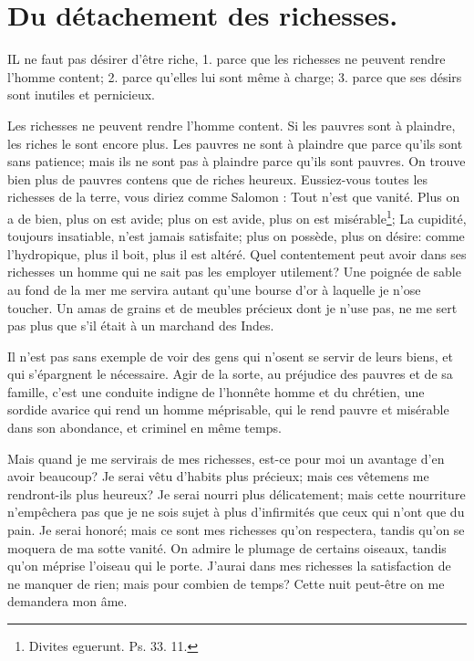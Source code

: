 \documentclass[instructions.tex]{subfiles}
\begin{document}
 
\chapter{Du détachement des richesses.}
 
IL ne faut pas désirer d’être riche, 1. parce que les richesses ne peuvent rendre l’homme content; 2. parce qu’elles lui sont même à charge; 3. parce que ses désirs sont inutiles et pernicieux.
 
\primo Les richesses ne peuvent rendre l’homme content. Si les pauvres sont à plaindre, les riches le sont encore plus. Les pauvres ne sont à plaindre que parce qu’ils sont sans patience; mais ils ne sont pas à plaindre parce qu’ils sont pauvres. On trouve bien plus de pauvres contens que de riches heureux. Eussiez-vous toutes les richesses de la terre, vous diriez comme Salomon : Tout n’est que vanité. Plus on a de bien, plus on est avide; plus on est avide, plus on est misérable\footnote{Divites eguerunt. Ps. 33. 11.}; La cupidité, toujours insatiable, n’est jamais satisfaite; plus on possède, plus on désire: comme l’hydropique, plus il boit, plus il est altéré. Quel contentement peut avoir dans ses richesses un homme qui ne sait pas les employer utilement? Une poignée de sable au fond de la mer me servira autant qu’une bourse d’or à laquelle je n’ose toucher. Un amas de grains et de meubles précieux dont je n’use pas, ne me sert pas plus que s’il était à un marchand des Indes.
 
Il n’est pas sans exemple de voir des gens qui n’osent se servir de leurs biens, et qui s’épargnent le nécessaire. Agir de la sorte, au préjudice des pauvres et de sa famille, c’est une conduite indigne de l’honnête homme et du chrétien, une sordide avarice qui rend un homme méprisable, qui le rend pauvre et misérable dans son abondance, et criminel en même temps.
 
Mais quand je me servirais de mes richesses, est-ce pour moi un avantage d’en avoir beaucoup? Je serai vêtu d’habits plus précieux; mais ces vêtemens me rendront-ils plus heureux? Je serai nourri plus délicatement; mais cette nourriture n’empêchera pas que je ne sois sujet à plus d’infirmités que ceux qui n’ont que du pain. Je serai honoré; mais ce sont mes richesses qu’on respectera, tandis qu’on se moquera de ma sotte vanité. On admire le plumage de certains oiseaux, tandis qu’on méprise l’oiseau qui le porte. J’aurai dans mes richesses la satisfaction de ne manquer de rien; mais pour combien de temps? Cette nuit peut-être on me demandera mon âme.
 
\end{document}
